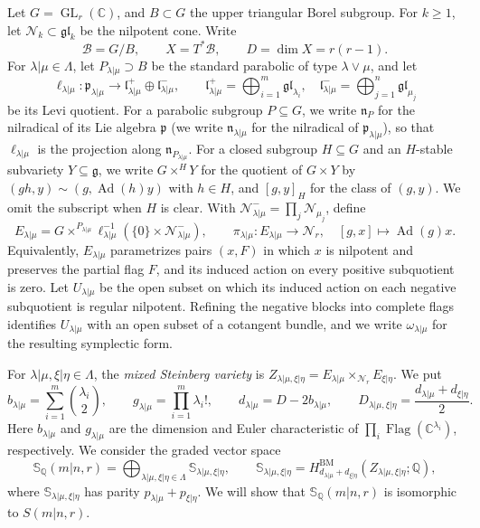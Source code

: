 \documentclass[11pt,a4paper]{amsart}
\theoremstyle{definition}
\theoremstyle{remark}
\newcommand{\C}{\mathbb C}
\newcommand{\Q}{\mathbb Q}
\newcommand{\N}{\mathcal N}
\newcommand{\B}{\mathcal B}
\newcommand{\bS}{\mathbb S}
\newcommand{\BM}{\mathrm{BM}}
\newcommand{\Flag}{\operatorname{Flag}}
\newcommand{\Ad}{\operatorname{Ad}}
\newcommand{\lm}{\lambda|\mu}
\newcommand{\xh}{\xi|\eta}
\numberwithin{equation}{section}
\begin{document}
Let $G=\operatorname{GL}_r(\C)$, and $B\subset G$ the upper
triangular Borel subgroup. For $k\ge 1$, let $\N_{k}\subset\mathfrak{gl}_{k}$ be
the nilpotent cone. Write
$$
\B=G/B,\qquad X=T^*\B,\qquad D=\dim X=r(r-1).
$$
For $\lm\in\Lambda$, let $P_{\lm}\supset B$ be the standard
parabolic of type $\lambda\vee\mu$, and let
$$
\ell_{\lm}:\mathfrak p_{\lm}\longrightarrow
\mathfrak l_{\lm}^+\oplus\mathfrak l_{\lm}^-,\qquad
\mathfrak l_{\lm}^+=\bigoplus_{i=1}^m\mathfrak{gl}_{\lambda_i},
\quad
\mathfrak l_{\lm}^-=\bigoplus_{j=1}^n\mathfrak{gl}_{\mu_j}
$$
be its Levi quotient. For a parabolic subgroup $P\subseteq G$, we write
$\mathfrak n_P$ for the nilradical of its Lie algebra $\mathfrak p$ (we write $\mathfrak n_{\lm}$ for the nilradical of $\mathfrak p_{\lm}$), so
that $\ell_{\lm}$ is the projection along $\mathfrak n_{P_{\lm}}$. For a
closed subgroup $H\subseteq G$ and an $H$-stable subvariety
$Y\subseteq\mathfrak g$, we write $G\times^HY$ for the quotient of
$G\times Y$ by $(gh,y)\sim(g,\Ad(h)y)$ with $h\in H$, and $[g,y]_H$ for
the class of $(g,y)$. We omit the subscript when $H$ is clear.
 With
$\N_{\lm}^-=\prod_j\N_{\mu_j}$, define
$$
E_{\lm}=G\times^{P_{\lm}}
\ell_{\lm}^{-1}(\{0\}\times\N_{\lm}^-),\qquad
\pi_{\lm}:E_{\lm}\longrightarrow\N_r,
\quad[g,x]\longmapsto\Ad(g)x.
$$
Equivalently, $E_{\lm}$ parametrizes pairs $(x,F)$ in which $x$ is
nilpotent and preserves the partial flag $F$, and its induced action
on every positive subquotient is zero. Let $U_{\lm}$ be the open
subset on which its induced action on each negative subquotient is
regular nilpotent. Refining the negative blocks into complete flags
identifies $U_{\lm}$ with an open subset of a cotangent bundle, and we
write $\omega_{\lm}$ for the resulting symplectic form.

For $\lm,\xh\in\Lambda$, the \emph{mixed Steinberg variety} is
$Z_{\lm,\xh}=E_{\lm}\times_{\N_r}E_{\xh}$. We put
\begin{equation}\label{eq:dimension-parameters}
b_{\lm}=\sum_{i=1}^m\binom{\lambda_i}{2},\qquad
g_{\lm}=\prod_{i=1}^m\lambda_i!,\qquad
d_{\lm}=D-2b_{\lm},\qquad
D_{\lm,\xh}=\frac{d_{\lm}+d_{\xh}}2.
\end{equation}
Here $b_{\lm}$ and $g_{\lm}$ are the dimension and Euler
characteristic of $\prod_i\Flag(\C^{\lambda_i})$, respectively.
We consider the graded vector space
\begin{equation}\label{eq:intro-convolution-algebra}
\bS_\Q(m|n,r)=\bigoplus_{\lm,\xh\in\Lambda}\bS_{\lm,\xh},\qquad
\bS_{\lm,\xh}
=H^{\BM}_{d_{\lm}+d_{\xh}}(Z_{\lm,\xh};\Q),
\end{equation}
where $\bS_{\lm,\xh}$ has parity $p_{\lm}+p_{\xh}$. We will show that
$\bS_\Q(m|n,r)$ is isomorphic to $S(m|n,r)$.
\end{document}
